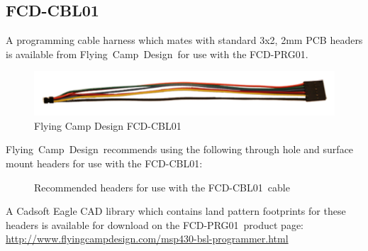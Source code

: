 \documentclass[10pt,letterpaper]{datasheet}
\newcommand{\PID}{FCD-PRG01}
\newcommand{\PIDCBL}{FCD-CBL01}
\newcommand{\fcd}{Flying~Camp~Design}
\begin{document}
\subsection*{\PIDCBL}
\begin{flushleft}
  A programming cable harness which mates with standard 3x2, 2mm PCB headers is available from \fcd\ for use with the \PID.
  
  \begin{figure}[!h]
    \label{fig:fcd-cbl01}
    \begin{center}
      \includegraphics[]{fcd-cbl01}
    \end{center}
    \caption{Flying Camp Design FCD-CBL01}
  \end{figure}
  
  \fcd\ recommends using the following through hole and surface mount headers for use with the \PIDCBL:
  
  \begin{figure}[!h]
    \label{fig:rec-prog-hdr}
    \begin{center}
      \caption{Recommended headers for use with the \PIDCBL\ cable}
    \end{center}
  \end{figure}
  
  A Cadsoft Eagle CAD library which contains land pattern footprints for these headers is available for download on the \PID\ product page: %
  \href{http://www.flyingcampdesign.com/msp430-bsl-programmer.html}%
       {http://www.flyingcampdesign.com/msp430-bsl-programmer.html} \newline


\end{flushleft}
\end{document}
